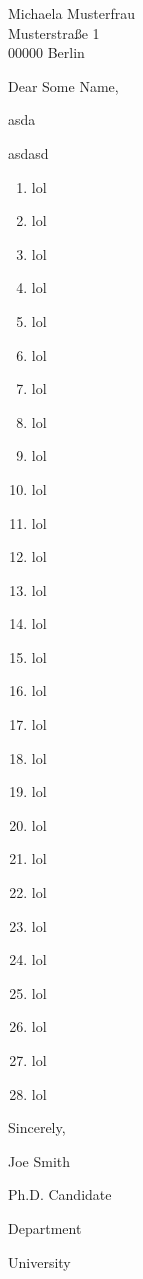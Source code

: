 \documentclass{defaultLetter}
\date{Mo 27.01.2015}
\begin{document}
\begin{letter}{Michaela Musterfrau \\ Musterstraße 1 \\ 00000 Berlin}%

\opening{Dear Some Name,}
\par\addvspace{\medskipamount}\noindent asda \par\addvspace{\medskipamount}\noindent asdasd



\lipsum


\begin{enumerate}
\item lol
\item lol
\item lol
\item lol
\item lol
\item lol
\item lol
\item lol
\item lol
\item lol
\item lol
\item lol
\item lol
\item lol
\item lol
\item lol
\item lol
\item lol
\item lol
\item lol
\item lol
\item lol
\item lol
\item lol
\item lol
\item lol
\item lol
\item lol



\end{enumerate}


\vfill

Sincerely,

\vfill

Joe Smith

Ph.D. Candidate

Department 

University 
\end{letter}
\end{document}
